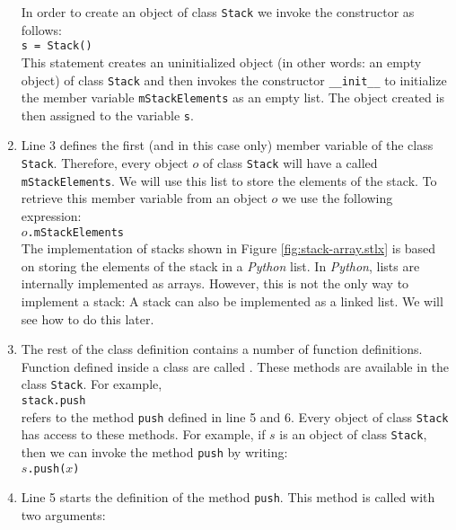 \begin{enumerate}
      In order to create an object of class \texttt{Stack} we invoke the constructor as follows:
      \\[0.2cm]
      \hspace*{1.3cm}
      \texttt{s = Stack()}
      \\[0.2cm]
      This statement creates an uninitialized object (in other words: an empty object) of class \texttt{Stack}
      and then invokes the constructor \texttt{\_\_init\_\_} to initialize the member variable
      \texttt{mStackElements} as an empty list.
      The object created is then assigned to the variable \texttt{s}.
\item Line 3 defines the first (and in this case only) member variable of the class \texttt{Stack}.
      Therefore, every object $o$ of class \texttt{Stack} will have a  called
      \texttt{mStackElements}. 
      We will use this list to store the elements of the stack.  To retrieve this member variable from
      an object $o$ we use the following expression:
      \\[0.2cm]
      \hspace*{1.3cm}
      $o$\texttt{.mStackElements}
      \\[0.2cm]
      The implementation of stacks shown
      in Figure \ref{fig:stack-array.stlx} is based on storing the elements of the stack in a
      \textsl{Python} list.  In \textsl{Python}, lists are internally implemented as arrays.  However,
      this is not the only way to implement a stack: A stack can also be implemented as a linked list.
      We will see how to do this later.
\item The rest of the class definition contains a number of function definitions.  Function defined inside
      a class are called .  These methods are available in the class \texttt{Stack}.  For example,
      \\[0.2cm]
      \hspace*{1.3cm}
      \texttt{stack.push}
      \\[0.2cm]
      refers to the method \texttt{push} defined in line 5 and 6. Every object of class
      \texttt{Stack} has access to these 
      methods.  For example, if $s$ is an object of class \texttt{Stack}, then we can invoke the
      method \texttt{push} by writing:
      \\[0.2cm]
      \hspace*{1.3cm}
      $s$\texttt{.push($x$)}
\item Line 5 starts the definition of the method \texttt{push}.  This method is called with two arguments:

\end{enumerate}

